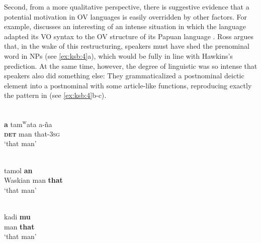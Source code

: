 \documentclass[output=paper]{langsci/langscibook}
\begin{document}
Second, from a more qualitative perspective, there is suggestive evidence that a potential  motivation in OV languages is easily overridden by other factors. For example, \citet{Ross2001_Contact} discusses an interesting  of an intense  situation in which the  language  adapted its VO syntax to the OV structure of its Papuan  language . Ross argues that, in the wake of this restructuring,  speakers must have shed the prenominal  word in NPs (see \ref{ex:ksb:4}a), which would be fully in line with Hawkins’s prediction. At the same time, however, the degree of linguistic  was so intense that  speakers also did something else: They grammaticalized a postnominal deictic element into a postnominal  with some article-like functions, reproducing exactly the  pattern in  (see \ref{ex:ksb:4}b-c).

\ea\label{ex:ksb:4} 
  \ea
  \\
  \gll \textbf{a}   tam\textsuperscript{w}ata   a-ña\\
      \textbf{\textsc{det}}   man   that-3\textsc{sg}\\
  \glt ‘that man’

  \ex 
  \\
  \gll {}   tamol  \textbf{an}\\
      Waskian   man   \textbf{that}\\
  \glt ‘that  man’

  \ex
  \\
  \gll {}   kadi   \textbf{mu}\\
         man   \textbf{that}\\
  \glt ‘that  man’
  \z
\z
\end{document}
